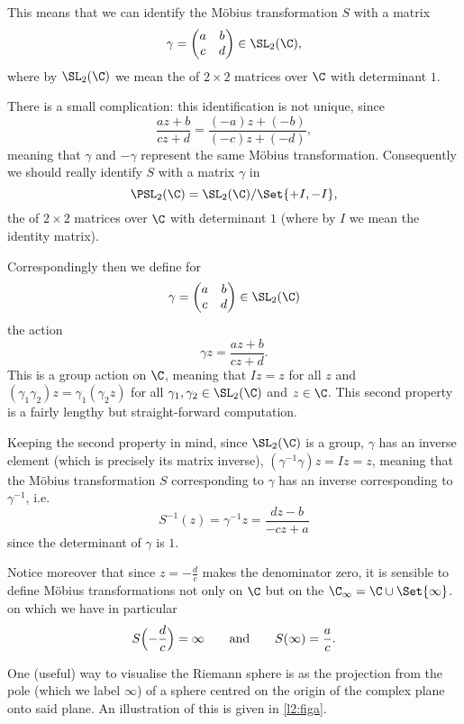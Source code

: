 This means that we can identify the Möbius transformation $S$ with a matrix
\[
	\gamma = \begin{pmatrix}
		a & b \\
		c & d
	\end{pmatrix} \in \SL_2(\C),
\]
where by $\SL_2(\C)$ we mean the  of $2 \times 2$ matrices over $\C$ with determinant $1$.

There is a small complication: this identification is not unique, since
\[
	\frac{a z + b}{c z + d} = \frac{(- a) z + (- b)}{(- c) z + (- d)},
\]
meaning that $\gamma$ and $-\gamma$ represent the same Möbius transformation.
Consequently we should really identify $S$ with a matrix $\gamma$ in
\[
	\PSL_2(\C) = \SL_2(\C) / \Set{+I, -I},
\]
the  of $2 \times 2$ matrices over $\C$ with determinant $1$ (where by $I$ we mean the identity matrix).

Correspondingly then we define for
\[
	\gamma = \begin{pmatrix}
		a & b \\
		c & d
	\end{pmatrix} \in \SL_2(\C)
\]
the action
\[
	\gamma z = \frac{a z + b}{c z + d}.
\]
This is a group action on $\C$, meaning that $I z = z$ for all $z$ and $(\gamma_1 \gamma_2) z = \gamma_1 (\gamma_2 z)$ for all $\gamma_1, \gamma_2 \in \SL_2(\C)$ and $z \in \C$.
This second property is a fairly lengthy but straight-forward computation.

Keeping the second property in mind, since $\SL_2(\C)$ is a group, $\gamma$ has an inverse element (which is precisely its matrix inverse), $(\gamma^{-1} \gamma) z = I z = z$, meaning that the Möbius transformation $S$ corresponding to $\gamma$ has an inverse corresponding to $\gamma^{-1}$, i.e.
\[
	S^{-1}(z) = \gamma^{-1} z = \frac{d z - b}{-c z + a}
\]
since the determinant of $\gamma$ is $1$.

Notice moreover that since $z = - \frac{d}{c}$ makes the denominator zero, it is sensible to define Möbius transformations not only on $\C$ but on the  $\C_\infty = \C \cup \Set{\infty}$. on which we have in particular
\[
	S\Bigl ( - \frac{d}{c} \Bigr ) = \infty \qquad \text{and} \qquad S(\infty) = \frac{a}{c}.
\]

One (useful) way to visualise the Riemann sphere is as the projection from the pole (which we label $\infty$) of a sphere centred on the origin of the complex plane onto said plane.
An illustration of this is given in \autoref{l2:figa}.

